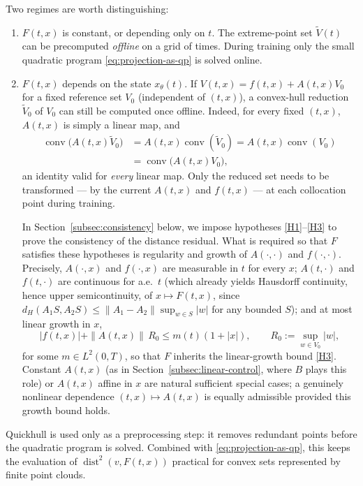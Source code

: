 \documentclass[11pt]{elsarticle}
\theoremstyle{definition}
\theoremstyle{remark}
\numberwithin{equation}{section}
\def\dist{\operatorname{dist}}
\begin{document}
	Two regimes are worth distinguishing:
	\begin{enumerate}
		\item $F(t,x)$ is constant, or depending only on $t$.
		The extreme-point set $\widetilde{V}(t)$ can be precomputed
		\emph{offline} on a grid of times.  During training only the small
		quadratic program \eqref{eq:projection-as-qp} is solved online.
		\item $F(t,x)$ depends on the state $x_\theta(t)$.
If $V(t,x)=f(t,x)+A(t,x)V_0$ for a fixed reference set $V_0$
(independent of $(t,x)$), a convex-hull reduction
$\widetilde{V}_0$ of $V_0$ can still be computed once offline.
Indeed, for every fixed $(t,x)$, $A(t,x)$ is simply a linear
map, and
\begin{align*}
\operatorname{conv}\big(A(t,x)\widetilde{V}_0\big)
& =A(t,x)\operatorname{conv}(\widetilde{V}_0)
=A(t,x)\operatorname{conv}(V_0)
\\ &
=\operatorname{conv}\big(A(t,x)V_0\big),
\end{align*}
an identity valid for \emph{every} linear map.
Only the reduced set needs to be transformed --- by the
current $A(t,x)$ and $f(t,x)$ --- at each collocation point
during training.

In Section~\ref{subsec:consistency} below, we impose hypotheses
\ref{H1}--\ref{H3} to prove the consistency of the distance residual.
What is required so that $F$ satisfies these hypotheses is regularity
and growth of $A(\cdot,\cdot)$ and $f(\cdot,\cdot)$. Precisely,
$A(\cdot,x)$ and $f(\cdot,x)$ are measurable in
$t$ for every $x$; $A(t,\cdot)$ and $f(t,\cdot)$ are continuous for
a.e.\ $t$ (which already yields Hausdorff continuity, hence
upper semicontinuity, of $x\mapsto F(t,x)$, since
$d_H(A_1S,A_2S)\le\|A_1-A_2\|\sup_{w\in S}|w|$ for any bounded
$S$); and at most linear growth in $x$,
\[
|f(t,x)|+\|A(t,x)\|\,R_0\le m(t)(1+|x|),
\qquad R_0:=\sup_{w\in V_0}|w|,
\]
for some $m\in L^2(0,T)$, so that $F$ inherits the
linear-growth bound \ref{H3}. Constant $A(t,x)$ (as in
Section~\ref{subsec:linear-control}, where $B$ plays this
role) or $A(t,x)$ affine in $x$ are natural sufficient special
cases; a genuinely nonlinear dependence
$(t,x)\mapsto A(t,x)$ is equally admissible provided this
growth bound holds.
\end{enumerate}
	
	Quickhull is used only as a preprocessing step: it removes redundant
	points before the quadratic program is solved. Combined with
	\eqref{eq:projection-as-qp}, this keeps the evaluation of
	$\dist^2(v,F(t,x))$ practical for convex sets represented by finite point
	clouds.
	
\end{document}
